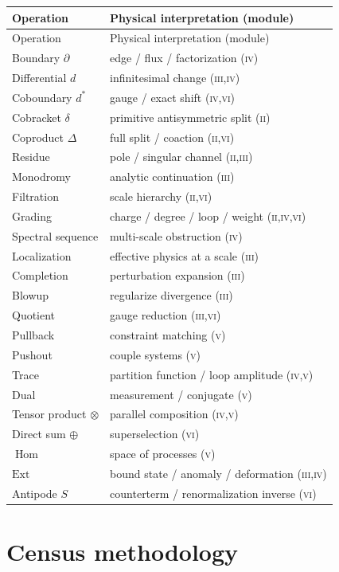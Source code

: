 \documentclass[12pt]{article}
\theoremstyle{definition}
\theoremstyle{remark}
\newcommand{\Hom}{\operatorname{Hom}}
\newcommand{\PII}{\textsc{ii}}
\newcommand{\PIII}{\textsc{iii}}
\newcommand{\PIV}{\textsc{iv}}
\newcommand{\PV}{\textsc{v}}
\newcommand{\PVI}{\textsc{vi}}
\begin{document}
\begin{longtable}{@{}p{}p{}@{}}
\toprule
Operation & Physical interpretation (module) \\
\midrule
\endfirsthead
\toprule
Operation & Physical interpretation (module) \\
\midrule
\endhead
\bottomrule
\endfoot
Boundary $\partial$ & edge / flux / factorization (\PIV) \\
Differential $d$ & infinitesimal change (\PIII,\PIV) \\
Coboundary $d^{*}$ & gauge / exact shift (\PIV,\PVI) \\
Cobracket $\delta$ & primitive antisymmetric split (\PII) \\
Coproduct $\Delta$ & full split / coaction (\PII,\PVI) \\
Residue & pole / singular channel (\PII,\PIII) \\
Monodromy & analytic continuation (\PIII) \\
Filtration & scale hierarchy (\PII,\PVI) \\
Grading & charge / degree / loop / weight (\PII,\PIV,\PVI) \\
Spectral sequence & multi-scale obstruction (\PIV) \\
Localization & effective physics at a scale (\PIII) \\
Completion & perturbation expansion (\PIII) \\
Blowup & regularize divergence (\PIII) \\
Quotient & gauge reduction (\PIII,\PVI) \\
Pullback & constraint matching (\PV) \\
Pushout & couple systems (\PV) \\
Trace & partition function / loop amplitude (\PIV,\PV) \\
Dual & measurement / conjugate (\PV) \\
Tensor product $\otimes$ & parallel composition (\PIV,\PV) \\
Direct sum $\oplus$ & superselection (\PVI) \\
$\Hom$ & space of processes (\PV) \\
$\mathrm{Ext}$ & bound state / anomaly / deformation (\PIII,\PIV) \\
Antipode $S$ & counterterm / renormalization inverse (\PVI) \\
\end{longtable}

\section{Census methodology}
\label{app:census}
\end{document}
